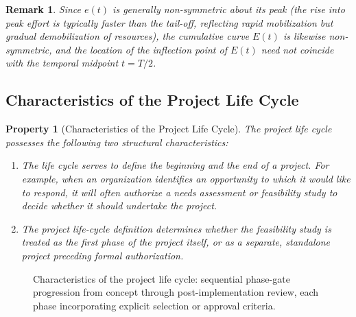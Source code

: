 \documentclass[12pt, a4paper]{report}
\theoremstyle{engnotes}
\newtheorem{property}{Property}[section]
\newtheorem{remark}{Remark}[section]
\begin{document}
\begin{remark}
    Since $e(t)$ is generally non-symmetric about its peak (the rise into peak effort is typically faster than the tail-off, reflecting rapid mobilization but gradual demobilization of resources), the cumulative curve $E(t)$ is likewise non-symmetric, and the location of the inflection point of $E(t)$ need not coincide with the temporal midpoint $t = T/2$.
\end{remark}

\subsection{Characteristics of the Project Life Cycle}
\label{subsec:life_cycle_characteristics}

\begin{property}[Characteristics of the Project Life Cycle]\label{pty:life_cycle_characteristics}
    The project life cycle possesses the following two structural characteristics:
    \begin{enumerate}
        \item The life cycle serves to define the \emph{beginning} and the \emph{end} of a project. For example, when an organization identifies an opportunity to which it would like to respond, it will often authorize a needs assessment or feasibility study to decide whether it should undertake the project.
        \item The project life-cycle definition determines whether the feasibility study is treated as the first phase of the project itself, or as a separate, standalone project preceding formal authorization.
    \end{enumerate}
\end{property}

\begin{figure}[H]
	\centering
	\caption{Characteristics of the project life cycle: sequential phase-gate progression from concept through post-implementation review, each phase incorporating explicit selection or approval criteria.}
	\label{fig:life_cycle_phase_gate}
\end{figure}
\end{document}
